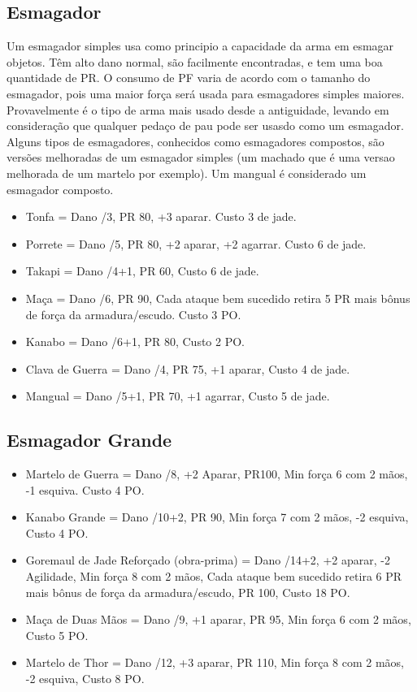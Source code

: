 \subsection{Esmagador}
Um esmagador simples usa como principio a capacidade da arma em esmagar objetos. Têm alto dano normal, são facilmente encontradas, e tem uma boa quantidade de PR. O consumo de PF varia de acordo com o tamanho do esmagador, pois uma maior força será usada para esmagadores simples maiores. Provavelmente é o tipo de arma mais usado desde a antiguidade, levando em consideração que qualquer pedaço de pau pode ser usasdo como um esmagador. Alguns tipos de esmagadores, conhecidos como esmagadores compostos, são versões melhoradas de um esmagador simples (um machado que é uma versao melhorada de um martelo por exemplo). Um mangual é considerado um esmagador composto.


\begin{itemize}	
	\item Tonfa = Dano /3, PR 80, +3 aparar. Custo 3 de jade.
	\item Porrete = Dano /5, PR 80, +2 aparar, +2 agarrar. Custo 6 de jade.		
	\item Takapi = Dano /4+1, PR 60, Custo 6 de jade.
	\item Maça = Dano /6, PR 90, Cada ataque bem	sucedido retira 5 PR mais bônus de força da armadura/escudo. Custo 3 PO.
	\item Kanabo = Dano /6+1, PR 80, Custo 2 PO.	
	\item Clava de Guerra = Dano /4, PR 75, +1 aparar, Custo 4 de jade.
	\item Mangual = Dano /5+1, PR 70, +1 agarrar, Custo 5 de jade.		
\end{itemize}	


\subsection{Esmagador Grande}

\begin{itemize}
	\item Martelo de Guerra = Dano /8, +2 Aparar, PR100, Min força 6 com 2 mãos, -1 esquiva.	Custo 4 PO.
	\item Kanabo Grande = Dano /10+2, PR 90, Min força 7 com 2 mãos, -2 esquiva, Custo 4 PO.	
	\item Goremaul de Jade Reforçado (obra-prima) = Dano /14+2, +2 aparar, -2 Agilidade, Min força 8 com 2 mãos, Cada ataque bem sucedido retira 6 PR mais bônus de força da armadura/escudo, PR 100, Custo 18 PO.
	\item Maça de Duas Mãos = Dano /9, +1 aparar, PR 95, Min força 6 com 2 mãos, Custo 5 PO.
	\item Martelo de Thor = Dano /12, +3 aparar, PR 110, Min força 8 com 2 mãos, -2 esquiva, Custo 8 PO.
\end{itemize}	

